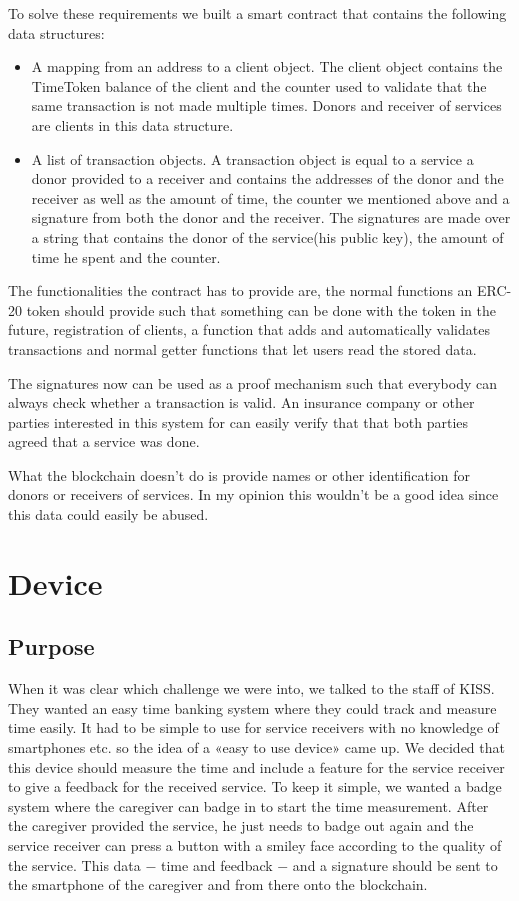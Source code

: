 \documentclass[12pt]{report}
\begin{document}
 To solve these requirements we built a smart contract that contains the following data structures:
\begin{itemize}
\item A mapping from an address to a client object. The client object contains the TimeToken balance of the client and the counter used to validate that the same transaction is not made multiple times.
Donors and receiver of services are clients in this data structure.

\item A list of transaction objects.
A transaction object is equal to a service a donor provided to a receiver and contains the addresses of the donor and the receiver as well as the amount of time, the counter we mentioned above and a signature from both the donor and the receiver.
The signatures are made over a string that contains the donor of the service(his public key), the amount of time he spent and the counter.
\end{itemize}
The functionalities the contract has to provide are, the normal functions an ERC-20 token should provide such that something can be done with the token in the future, registration of clients, a function that adds and automatically validates transactions and normal getter functions that let users read the stored data.

The signatures now can be used as a proof mechanism such that everybody can always check whether a transaction is valid.
An insurance company or other parties interested in this system for can easily verify that that both parties agreed that a service was done.

What the blockchain doesn't do is provide names or other identification for donors or receivers of services.
In my opinion this wouldn't be a good idea since this data could easily be abused.

\section{Device}\label{device}
\subsection{Purpose}
When it was clear which challenge we were into, we talked to the staff of KISS. They wanted an easy time banking system where they could track and measure time easily. It had to be simple to use for service receivers with no knowledge of smartphones etc. so the idea of a «easy to use device» came up. We decided that this device should measure the time and include a feature for the service receiver to give a feedback for the received service. To keep it simple, we wanted a badge system where the caregiver can badge in to start the time measurement. After the caregiver provided the service, he just needs to badge out again and the service receiver can press a button with a smiley face according to the quality of the service. This data $-$ time and feedback $-$ and a signature should be sent to the smartphone of the caregiver and from there onto the blockchain.
\end{document}
